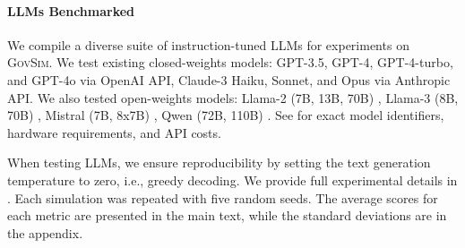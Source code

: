 \documentclass{article}
\newif\ifarxiv
\newcommand{\envAbbr}{\textsc{GovSim}\xspace}
\begin{document}
\paragraph{LLMs Benchmarked}
\label{p:models}
We compile a diverse suite of instruction-tuned LLMs for experiments on \envAbbr. We test existing closed-weights models: GPT-3.5, GPT-4, GPT-4-turbo, and GPT-4o \citep{achiam2023gpt} via OpenAI API, Claude-3 Haiku, Sonnet, and Opus via Anthropic API. We also tested open-weights models: Llama-2 (7B, 13B, 70B) \citep{touvron2023llama}, Llama-3 (8B, 70B) \citep{meta2024llama}, Mistral (7B, 8x7B) \citep{jiang2023mistral}, Qwen (72B, 110B) \citep{bai2023qwen}. See  for exact model identifiers, hardware requirements, and API costs.

When testing LLMs, we ensure reproducibility by setting the text generation temperature to zero, i.e., greedy decoding. We provide full experimental details in \ifarxiv \  and on our GitHub\else \fi. Each simulation was repeated with five random seeds. The average scores for each metric are presented in the main text, while the standard deviations are in the appendix.
\end{document}
